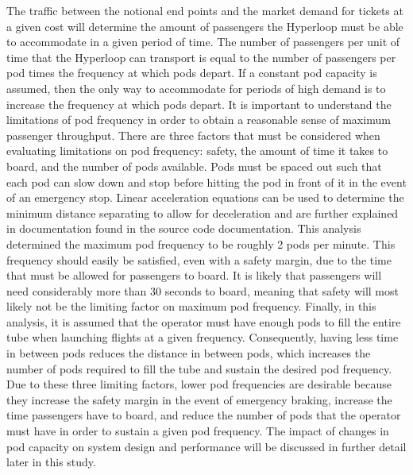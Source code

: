 The traffic between the notional end points and the market demand for tickets
at a given cost will determine the amount of passengers the Hyperloop must be
able to accommodate in a given period of time. The number of passengers per
unit of time that the Hyperloop can transport is equal to the number of
passengers per pod times the frequency at which pods depart. If a constant pod
capacity is assumed, then the only way to accommodate for periods of high
demand is to increase the frequency at which pods depart. It is important to
understand the limitations of pod frequency in order to obtain a reasonable
sense of maximum passenger throughput. There are three factors that must be
considered when evaluating limitations on pod frequency: safety, the amount of
time it takes to board, and the number of pods available. Pods must be spaced
out such that each pod can slow down and stop before hitting the pod in front
of it in the event of an emergency stop. Linear acceleration equations can be
used to determine the minimum distance separating to allow for deceleration
and are further explained in documentation found in the source code
documentation. This analysis determined the maximum pod frequency to be
roughly 2 pods per minute. This frequency should easily be satisfied, even
with a safety margin, due to the time that must be allowed for passengers to
board. It is likely that passengers will need considerably more than 30
seconds to board, meaning that safety will most likely not be the limiting factor on
maximum pod frequency. Finally, in this analysis, it is assumed that the
operator must have enough pods to fill the entire tube when launching flights
at a given frequency. Consequently, having less time in between pods reduces
the distance in between pods, which increases the number of pods required to
fill the tube and sustain the desired pod frequency. Due to these three
limiting factors, lower pod frequencies are desirable because they increase
the safety margin in the event of emergency braking, increase the time
passengers have to board, and reduce the number of pods that the operator must
have in order to sustain a given pod frequency. The impact of changes in pod
capacity on system design and performance will be discussed in further detail
later in this study.
